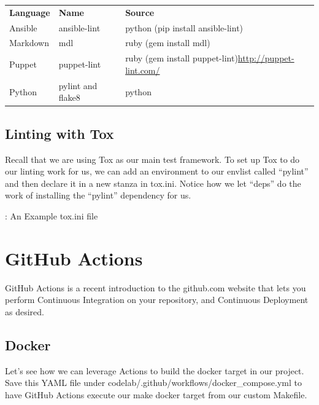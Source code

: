 \begin{table}[h]
	\begin{center}
		\begin{tabular}{| p{2.5cm}| p{2.5cm} | p{2.5cm} |}
			\hline
			\textbf{Language} & \textbf{Name} & \textbf{Source}\hfill                                                        \\
			Ansible           & ansible-lint  & python (pip install ansible-lint)                                      \\
			Markdown          & mdl           & ruby (gem install mdl)                                                 \\
			Puppet            & puppet-lint   & ruby (gem install puppet-lint)\url{http://puppet-lint.com/} \\
			Python            & pylint and flake8 & python \\
		\end{tabular}
	\end{center}
\end{table}

\subsection{Linting with Tox}

Recall that we are using Tox as our main test framework. To set up Tox
to do our linting work for us, we can add an environment to our envlist
called ``pylint'' and then declare it in a new stanza in tox.ini. Notice
how we let ``deps'' do the work of installing the ``pylint'' dependency for
us.

\begin{mybox}{\thetcbcounter: An Example tox.ini file}
	
\end{mybox}

\section{GitHub Actions}

\justify{}
GitHub Actions is a recent introduction to the github.com website that
lets you perform Continuous Integration on your repository, and Continuous
Deployment as desired.

\subsection{Docker}
\justify{}
Let's see how we can leverage Actions to build the docker target in our
project. Save this YAML file under
codelab/.github/workflows/docker\_compose.yml to have GitHub Actions
execute our make docker target from our custom Makefile.

